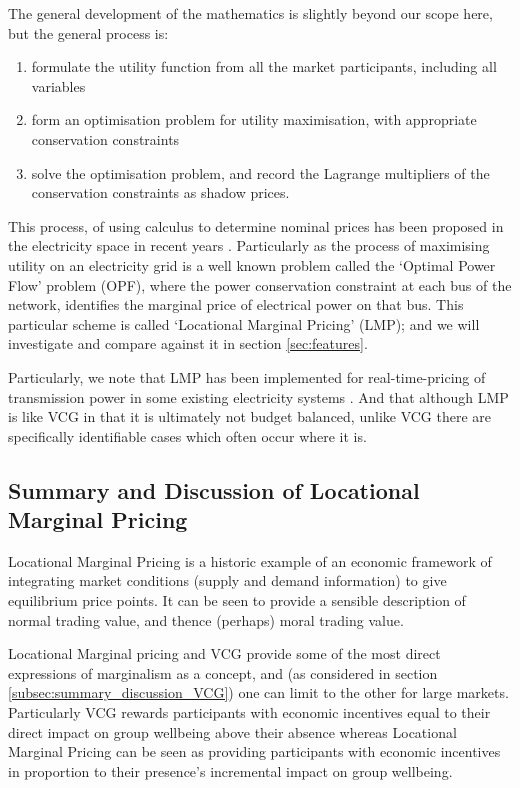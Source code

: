 The general development of the mathematics is slightly beyond our scope here, but the general process is:
\begin{enumerate}
\item formulate the utility function from all the market participants, including all variables
\item form an optimisation problem for utility maximisation, with appropriate conservation constraints
\item solve the optimisation problem, and record the Lagrange multipliers of the conservation constraints as shadow prices.
\end{enumerate}
This process, of using calculus to determine nominal prices has been proposed in the electricity space in recent years \cite{lmp1, lmp2, lmp4, game3}.
Particularly as the process of maximising utility on an electricity grid is a well known problem called the `Optimal Power Flow' problem (OPF), where the power conservation constraint at each bus of the network, identifies the marginal price of electrical power on that bus.
This particular scheme is called `Locational Marginal Pricing' (LMP); and we will investigate and compare against it in section \ref{sec:features}.

Particularly, we note that LMP has been implemented for real-time-pricing of transmission power in some existing electricity systems \cite{WANG2015695,zonal}.
And that although LMP is like VCG in that it is ultimately not budget balanced, unlike VCG there are specifically identifiable cases which often occur where it is.\cite{lmp2}


\subsection{Summary and Discussion of Locational Marginal Pricing}

Locational Marginal Pricing is a historic example of an economic framework of integrating market conditions (supply and demand information) to give equilibrium price points.
It can be seen to provide a sensible description of normal trading value, and thence (perhaps) moral trading value.

Locational Marginal pricing and VCG provide some of the most direct expressions of marginalism as a concept, and (as considered in section \ref{subsec:summary_discussion_VCG}) one can limit to the other for large markets.
Particularly VCG rewards participants with economic incentives equal to their direct impact on group wellbeing above their absence whereas Locational Marginal Pricing can be seen as providing participants with economic incentives in proportion to their presence's incremental impact on group wellbeing.

